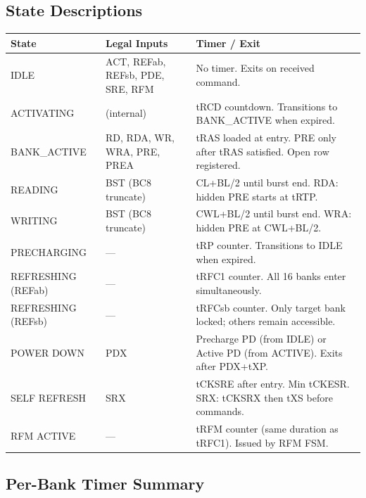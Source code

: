 \documentclass[10pt,a4paper]{article}
\newcommand{\Th}[1]{\cellcolor{cellbg}\textbf{\small #1}}
\newcommand{\RA}{\rowcolor{white}}
\newcommand{\RB}{\rowcolor{altbg}}
\begin{document}
\subsection{State Descriptions}

\begin{center}
\begin{tabularx}{\linewidth}{@{} l l X @{}}
\toprule
\Th{State} & \Th{Legal Inputs} & \Th{Timer / Exit} \\
\midrule
\RA IDLE & ACT, REFab, REFsb, PDE, SRE, RFM & No timer. Exits on received command. \\
\RB ACTIVATING & (internal) & tRCD countdown. Transitions to BANK\_ACTIVE when expired. \\
\RA BANK\_ACTIVE & RD, RDA, WR, WRA, PRE, PREA & tRAS loaded at entry. PRE only after tRAS satisfied. Open row registered. \\
\RB READING & BST (BC8 truncate) & CL+BL/2 until burst end. RDA: hidden PRE starts at tRTP. \\
\RA WRITING & BST (BC8 truncate) & CWL+BL/2 until burst end. WRA: hidden PRE at CWL+BL/2. \\
\RB PRECHARGING & --- & tRP counter. Transitions to IDLE when expired. \\
\RA REFRESHING (REFab) & --- & tRFC1 counter. All 16 banks enter simultaneously. \\
\RB REFRESHING (REFsb) & --- & tRFCsb counter. Only target bank locked; others remain accessible. \\
\RA POWER DOWN & PDX & Precharge PD (from IDLE) or Active PD (from ACTIVE). Exits after PDX+tXP. \\
\RB SELF REFRESH & SRX & tCKSRE after entry. Min tCKESR. SRX: tCKSRX then tXS before commands. \\
\RA RFM ACTIVE & --- & tRFM counter (same duration as tRFC1). Issued by RFM FSM. \\
\bottomrule
\end{tabularx}
\end{center}

\subsection{Per-Bank Timer Summary}
\end{document}
